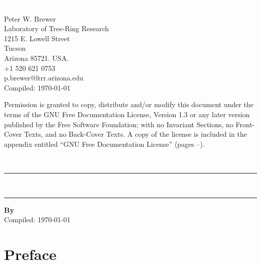 


\thispagestyle{empty} 
\includegraphics{Images/pixel.png}
\vfill
\parbox[b]{11cm}{\raggedright

\textcopyright {\the\year} Peter W. Brewer\\[2mm] Laboratory of Tree-Ring Research\\ 1215 E. Lowell Street \\
Tucson\\
Arizona 85721. USA.\\[0.5cm] \Telefon\hspace{3mm}+1 520 621 0753 \\ \Letter\hspace{3mm}p.brewer@ltrr.arizona.edu\\[5mm] Compiled: \today\\[10mm]}

{\footnotesize 
Permission is granted to copy, distribute and/or modify this document
under the terms of the GNU Free Documentation License, Version 1.3
or any later version published by the Free Software Foundation;
with no Invariant Sections, no Front-Cover Texts, and no Back-Cover Texts.
A copy of the license is included in the appendix entitled ``GNU Free Documentation License'' (pages \pageref{txt:FDLStart}--\pageref{txt:FDLEnd}).}



\newpage
{}
\setcounter{page}{1}
\thispagestyle{empty} 
{ \includegraphics{Images/pixel.png}\\[4cm] 
\hrule 
\vspace{5mm}
\Huge \bfseries \thetitle\\[3mm] 
\large{\thesubtitle}
\vspace{5mm}
\hrule
\vspace{3cm}
}
{
\normalsize
\textbf{By \authornames}\\[0.6cm]
}
{
\vfill
\footnotesize
Compiled: \today
}

\newpage


\tableofcontents


\cleardoublepage
{} 

\section*{Preface}
\thispagestyle{empty} 

